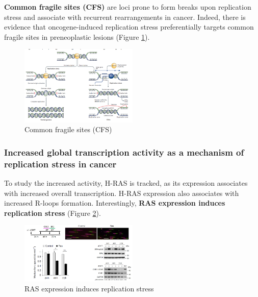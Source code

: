 	
\textbf{Common fragile sites (CFS)} are loci prone to form breaks upon
replication stress and associate with recurrent rearrangements in
cancer. Indeed, there is evidence that oncogene-induced replication
stress preferentially targets common fragile sites in preneoplastic
lesions (Figure \ref{fig:CFS}).

\begin{figure}
\centering
\includegraphics[width=0.5\textwidth]{../_resources/c0296c07042a0397b2b5c43d74b2f158.png}
\caption{Common fragile sites (CFS)}
\label{fig:CFS}
\end{figure}

\hypertarget{increased-global-transcription-activity-as-a-mechanism-of-replication-stress-in-cancer}{%
\subsubsection{Increased global transcription activity as a mechanism of
replication stress in
cancer}\label{increased-global-transcription-activity-as-a-mechanism-of-replication-stress-in-cancer}}

To study the increased activity, H-RAS is tracked, as its expression
associates with increased overall transcription. H-RAS expression also
associates with increased R-loops formation. Interestingly, \textbf{RAS
expression induces replication stress} (Figure \ref{fig:RAS}).

\begin{figure}[h!]
\centering
\includegraphics[width=0.5\textwidth]{../_resources/74f971d93ec73bb49f66e1c9f6c16c26.png}
\caption{RAS expression induces replication stress}
\label{fig:RAS}
\end{figure}

